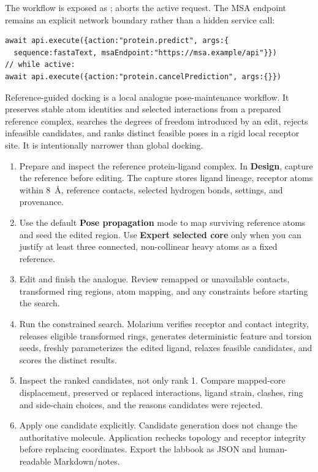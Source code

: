 The workflow is exposed as ;  aborts the active request. The MSA endpoint remains an explicit network boundary rather than a hidden service call:

\begin{lstlisting}
await api.execute({action:"protein.predict", args:{
  sequence:fastaText, msaEndpoint:"https://msa.example/api"}})
// while active:
await api.execute({action:"protein.cancelPrediction", args:{}})
\end{lstlisting}


Reference-guided docking is a local analogue pose-maintenance workflow. It preserves stable atom identities and selected interactions from a prepared reference complex, searches the degrees of freedom introduced by an edit, rejects infeasible candidates, and ranks distinct feasible poses in a rigid local receptor site. It is intentionally narrower than global docking.


\begin{enumerate}
\item Prepare and inspect the reference protein-ligand complex. In \textbf{Design}, capture the reference before editing. The capture stores ligand lineage, receptor atoms within 8~\AA, reference contacts, selected hydrogen bonds, settings, and provenance.
\item Use the default \textbf{Pose propagation} mode to map surviving reference atoms and seed the edited region. Use \textbf{Expert selected core} only when you can justify at least three connected, non-collinear heavy atoms as a fixed reference.
\item Edit and finish the analogue. Review remapped or unavailable contacts, transformed ring regions, atom mapping, and any constraints before starting the search.
\item Run the constrained search. Molarium verifies receptor and contact integrity, releases eligible transformed rings, generates deterministic feature and torsion seeds, freshly parameterizes the edited ligand, relaxes feasible candidates, and scores the distinct results.
\item Inspect the ranked candidates, not only rank 1. Compare mapped-core displacement, preserved or replaced interactions, ligand strain, clashes, ring and side-chain choices, and the reasons candidates were rejected.
\item Apply one candidate explicitly. Candidate generation does not change the authoritative molecule. Application rechecks topology and receptor integrity before replacing coordinates. Export the labbook as JSON and human-readable Markdown/notes.
\end{enumerate}

